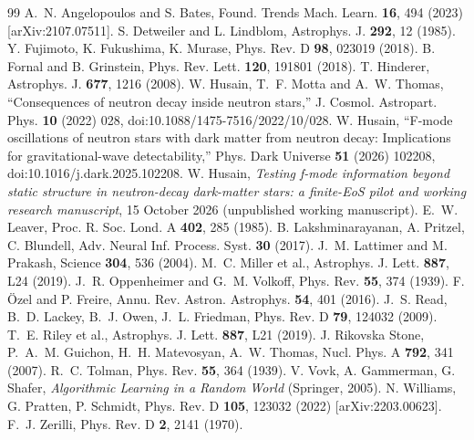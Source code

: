 \documentclass[11pt,a4paper]{article}
\begin{document}
\begin{thebibliography}{99}
 A.~N. Angelopoulos and S. Bates, Found. Trends Mach. Learn. \textbf{16}, 494 (2023) [arXiv:2107.07511].
 S. Detweiler and L. Lindblom, Astrophys. J. \textbf{292}, 12 (1985).
 Y. Fujimoto, K. Fukushima, K. Murase, Phys. Rev. D \textbf{98}, 023019 (2018).
 B. Fornal and B. Grinstein, Phys. Rev. Lett. \textbf{120}, 191801 (2018).
 T. Hinderer, Astrophys. J. \textbf{677}, 1216 (2008).
 W. Husain, T.~F. Motta and A.~W. Thomas, ``Consequences of neutron decay inside neutron stars,'' J. Cosmol. Astropart. Phys. \textbf{10} (2022) 028, doi:10.1088/1475-7516/2022/10/028.
 W. Husain, ``F-mode oscillations of neutron stars with dark matter from neutron decay: Implications for gravitational-wave detectability,'' Phys. Dark Universe \textbf{51} (2026) 102208, doi:10.1016/j.dark.2025.102208.
 W. Husain, \emph{Testing f-mode information beyond static structure in neutron-decay dark-matter stars: a finite-EoS pilot and working research manuscript}, 15 October 2026 (unpublished working manuscript).
 E.~W. Leaver, Proc. R. Soc. Lond. A \textbf{402}, 285 (1985).
 B. Lakshminarayanan, A. Pritzel, C. Blundell, Adv. Neural Inf. Process. Syst. \textbf{30} (2017).
 J.~M. Lattimer and M. Prakash, Science \textbf{304}, 536 (2004).
 M.~C. Miller et al., Astrophys. J. Lett. \textbf{887}, L24 (2019).
 J.~R. Oppenheimer and G.~M. Volkoff, Phys. Rev. \textbf{55}, 374 (1939).
 F. \"Ozel and P. Freire, Annu. Rev. Astron. Astrophys. \textbf{54}, 401 (2016).
 J.~S. Read, B.~D. Lackey, B.~J. Owen, J.~L. Friedman, Phys. Rev. D \textbf{79}, 124032 (2009).
 T.~E. Riley et al., Astrophys. J. Lett. \textbf{887}, L21 (2019).
 J. Rikovska Stone, P.~A.~M. Guichon, H.~H. Matevosyan, A.~W. Thomas, Nucl. Phys. A \textbf{792}, 341 (2007).
 R.~C. Tolman, Phys. Rev. \textbf{55}, 364 (1939).
 V. Vovk, A. Gammerman, G. Shafer, \emph{Algorithmic Learning in a Random World} (Springer, 2005).
 N. Williams, G. Pratten, P. Schmidt, Phys. Rev. D \textbf{105}, 123032 (2022) [arXiv:2203.00623].
 F.~J. Zerilli, Phys. Rev. D \textbf{2}, 2141 (1970).
\end{thebibliography}
\end{document}
